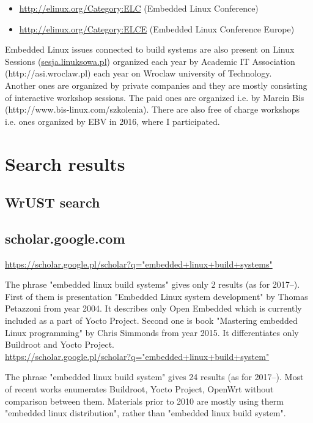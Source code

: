 \documentclass[printmode]{mgr}
\begin{document}
\begin{itemize}
  \item \url{http://elinux.org/Category:ELC} (Embedded Linux Conference)
  \item \url{http://elinux.org/Category:ELCE} (Embedded Linux Conference Europe)
\end{itemize}

Embedded Linux issues connected to build systems are also present on Linux Sessions (\url{sesja.linuksowa.pl}) organized each year by Academic IT Association (http://asi.wroclaw.pl) each year on Wroclaw university of Technology. \\

Another ones are organized by private companies and they are mostly consisting of interactive workshop sessions. The paid ones are organized i.e. by Marcin Bis (http://www.bis-linux.com/szkolenia). There are also free of charge workshops i.e. ones organized by EBV in 2016, where I participated.

\section{Search results}

\subsection{WrUST search}

\subsection{scholar.google.com}

\url{https://scholar.google.pl/scholar?q="embedded+linux+build+systems"}

The phrase "embedded linux build systems" gives only 2 results (as for 2017--). First of them is presentation "Embedded Linux system development" by Thomas Petazzoni from year 2004. It describes only Open Embedded which is currently included as a part of Yocto Project. Second one is book "Mastering embedded Linux programming" by Chris Simmonds from year 2015. It differentiates only Buildroot and Yocto Project. \\

\url{https://scholar.google.pl/scholar?q="embedded+linux+build+system"}

The phrase "embedded linux build system" gives 24 results (as for 2017--). Most of recent works enumerates Buildroot, Yocto Project, OpenWrt without comparison between them. Materials prior to 2010 are mostly using therm "embedded linux distribution", rather than "embedded linux build system".
\end{document}
